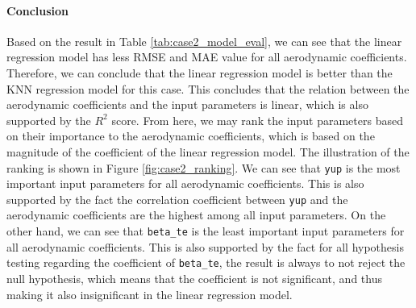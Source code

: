 \documentclass[conf]{new-aiaa}
\begin{document}
\paragraph{Conclusion}
Based on the result in Table \ref{tab:case2_model_eval}, we can see that the linear regression model has less RMSE and MAE value for all aerodynamic coefficients. Therefore, we can conclude that the linear regression model is better than the KNN regression model for this case. This concludes that the relation between the aerodynamic coefficients and the input parameters is linear, which is also supported by the $R^2$ score. From here, we may rank the input parameters based on their importance to the aerodynamic coefficients, which is based on the magnitude of the coefficient of the linear regression model. The illustration of the ranking is shown in Figure \ref{fig:case2_ranking}. We can see that \texttt{yup} is the most important input parameters for all aerodynamic coefficients. This is also supported by the fact the correlation coefficient between \texttt{yup} and the aerodynamic coefficients are the highest among all input parameters. On the other hand, we can see that \texttt{beta\_te} is the least important input parameters for all aerodynamic coefficients. This is also supported by the fact for all hypothesis testing regarding the coefficient of \texttt{beta\_te}, the result is always to not reject the null hypothesis, which means that the coefficient is not significant, and thus making it also insignificant in the linear regression model.
\end{document}
